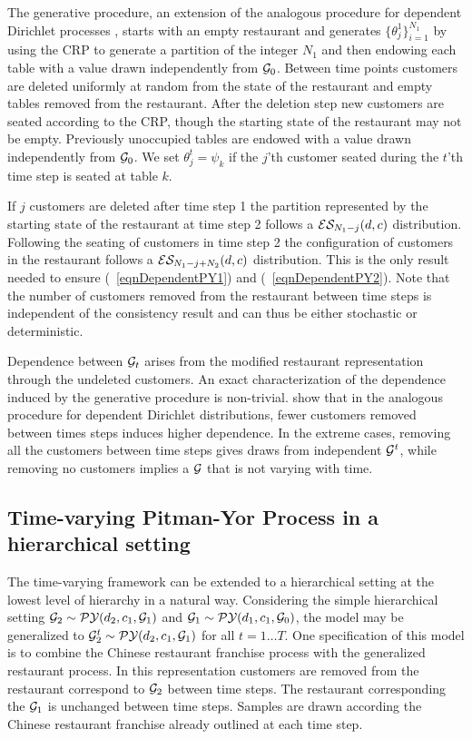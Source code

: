 The generative procedure, an extension of the analogous procedure for dependent Dirichlet processes \cite{caron}, starts with an empty restaurant and generates $\{ \theta_j^1\}_{i = 1}^{N_1}$ by using the CRP to generate a partition of the integer $N_1$ and then endowing each table with a value drawn independently from $\G_0$.  Between time points customers are deleted uniformly at random from the state of the restaurant and empty tables removed from the restaurant.  After the deletion step new customers are seated according to the CRP, though the starting state of the restaurant may not be empty.  Previously unoccupied tables are endowed with a value drawn independently from $\G_0$.  We set $\theta^t_j = \psi_k$ if  the $j$'th customer seated during the $t$'th time step is seated at table $k$.

If $j$ customers are deleted after time step 1 the partition represented by the starting state of the restaurant at time step 2 follows a $\ES_{N_1- j}(d,c)$ distribution.  Following the seating of customers in time step 2 the configuration of customers in the restaurant follows a $\ES_{N_1 - j + N_2}(d,c)$ distribution.  This is the only result needed to ensure (~\ref{eqnDependentPY1}) and (~\ref{eqnDependentPY2}).  Note that the number of customers removed from the restaurant between time steps is independent of the consistency result and can thus be either stochastic or deterministic.

Dependence between $\G_t$ arises from the modified restaurant representation through the undeleted customers.  An exact characterization of the dependence induced by the generative procedure is non-trivial.   \cite{caron} show that in the analogous procedure for dependent Dirichlet distributions, fewer customers removed between times steps induces higher dependence.  In the extreme cases, removing all the customers between time steps gives draws from independent $\G^t$, while removing no customers implies a $\G$ that is not varying with time. 

\subsection{Time-varying Pitman-Yor Process in a hierarchical setting}

The time-varying framework can be extended to a hierarchical setting at the lowest level of hierarchy in a natural way.  Considering the simple hierarchical setting $\G_2 \sim \PY(d_2, c_1, \G_1)$ and $\G_1 \sim \PY(d_1, c_1, \G_0)$, the model may be generalized to $\G^t_2 \sim  \PY(d_2, c_1, \G_1)$ for all $t  = 1 \dots T$.  One specification of this model is to combine the Chinese restaurant franchise process with the generalized restaurant process.  In this representation customers are removed from the restaurant correspond to $\G_2$ between time steps.  The restaurant corresponding the $\G_1$ is unchanged between time steps. Samples are drawn according the Chinese restaurant franchise already outlined at each time step.

